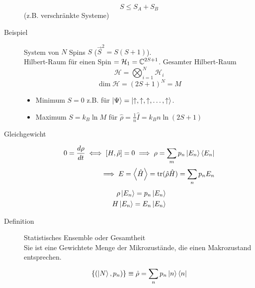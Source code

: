 \begin{description}
  \[ S \le S_A + S_B \] (z.B. verschr\"ankte Systeme)
\item[Beispiel] System von $N$ Spins $S$ ($\vec{S}^2 =  S(S+1)$). \\
  Hilbert-Raum f\"ur einen Spin $= \mathcal{H}_1 = \mathbb{C}^{2S+1}$.
  Gesamter Hilbert-Raum \[ \mathcal{H} = \bigotimes_{i=1}^{N} \mathcal{H}_i \] 
  \[ \operatorname{dim} \mathcal{H} = (2S+1)^N = M \] 
  \begin{itemize}
    \item Minimum $S=0$ z.B. f\"ur $\Ket{\Psi} = \Ket{ \uparrow, \uparrow, \uparrow, \ldots, \uparrow}$.
    \item Maximum $S= k_B \ln{M}$ f\"ur $\hat{\rho}= \frac{1}{n} \hat{I}=
      k_B n \ln{(2S+1)}$
  \end{itemize}
\item[Gleichgewicht]
  \begin{align*}
    0= \frac{d \rho }{dt} \iff \left[ H, \hat{\rho} \right]=0 \implies 
    \rho = \sum_{m}^{} p_n \Ket{E_n} \Bra{E_n} \\
    \implies E = \Braket{\hat{H}} = \operatorname{tr} (\hat{\rho} \hat{H})
    = \sum_{n}^{} p_n E_n
  \end{align*}
  \begin{align*}
    \rho \Ket{E_n} = p_n \Ket{E_n} \\
    H \Ket{E_n} = E_n \Ket{E_n}
  \end{align*}
\end{description}
\begin{description}
  \item[Definition]  Statistisches Ensemble oder Gesamtheit \\
    Sie ist eine Gewichtete Menge der Mikrozust\"ande, die einen 
    Makrozustand entsprechen.
    \begin{align*}
      \left\{ ( \Ket{N}, p_n) \right\} \equiv \hat{\rho} = \sum_{n}^{} p_n
      \Ket{n} \Bra{n} 
    \end{align*}
\end{description}
